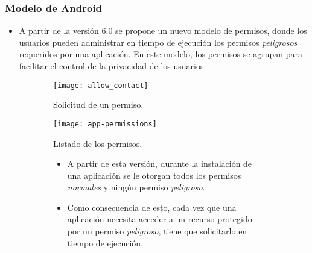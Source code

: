 \begin{frame}
 \frametitle{Modelo de Android}
 \begin{itemize}
  \item A partir de la versión 6.0 se propone un nuevo modelo de permisos, donde los usuarios pueden administrar en tiempo de ejecución los permisos \emph{peligrosos} requeridos por una aplicación. \pause En este modelo, los permisos se agrupan para facilitar el control de la privacidad de los usuarios.\pause
 \end{itemize}
 \begin{figure}[btp]
    \centering
    \begin{subfigure}{0.2\linewidth}
        \texttt{[image: allow\_contact]}
        \caption{Solicitud de un permiso.}
    \end{subfigure}
    \begin{subfigure}{0.2\linewidth}
        \texttt{[image: app-permissions]}
        \caption{Listado de los permisos.}
	\end{subfigure}
	\begin{subfigure}{.5\linewidth}
	 \begin{small}\pause
	 \begin{itemize}
	  \item A partir de esta versión, durante la instalación de una aplicación se le otorgan todos los permisos \emph{normales} y ningún permiso \emph{peligroso}.\pause
  \item Como consecuencia de esto, cada vez que una aplicación necesita acceder a un recurso protegido por un permiso \emph{peligroso}, tiene que solicitarlo en tiempo de ejecución.
    \end{itemize}
    \end{small}
   \end{subfigure}
 \end{figure}
\end{frame}